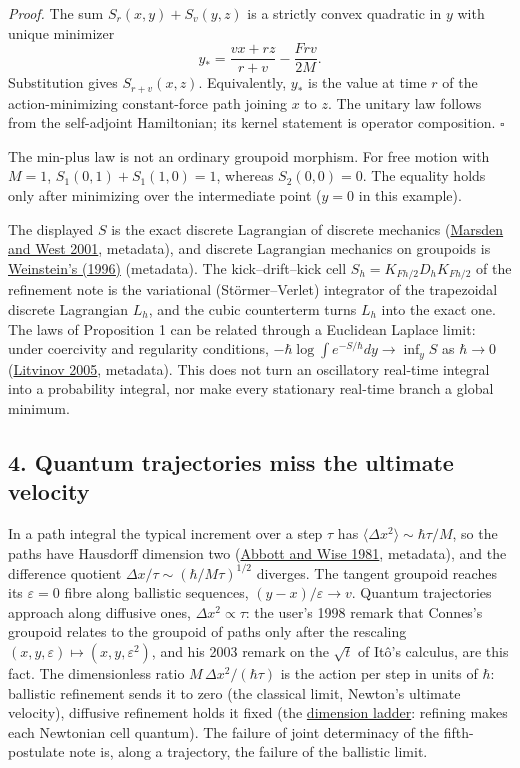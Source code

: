 \documentclass[11pt,a4paper]{article}
\begin{document}
\emph{Proof.} The sum \(S_r(x,y)+S_v(y,z)\) is a strictly convex
quadratic in \(y\) with unique minimizer
\[y_*=\frac{vx+rz}{r+v}-\frac{Frv}{2M}.\] Substitution gives
\(S_{r+v}(x,z)\). Equivalently, \(y_*\) is the value at time \(r\) of
the action-minimizing constant-force path joining \(x\) to \(z\). The
unitary law follows from the self-adjoint Hamiltonian; its kernel
statement is operator composition. \(\square\)

The min-plus law is not an ordinary groupoid morphism. For free motion
with \(M=1\), \(S_1(0,1)+S_1(1,0)=1\), whereas \(S_2(0,0)=0\). The
equality holds only after minimizing over the intermediate point
(\(y=0\) in this example).

The displayed \(S\) is the exact discrete Lagrangian of discrete
mechanics (\href{https://doi.org/10.1017/S096249290100006X}{Marsden and
West 2001}, metadata), and discrete Lagrangian mechanics on groupoids is
\href{https://doi.org/10.1090/fic/007/10}{Weinstein's (1996)}
(metadata). The kick--drift--kick cell \(S_h=K_{Fh/2}D_hK_{Fh/2}\) of
the refinement note is the variational (Störmer--Verlet) integrator of
the trapezoidal discrete Lagrangian \(L_h\), and the cubic counterterm
turns \(L_h\) into the exact one. The laws of Proposition 1 can be
related through a Euclidean Laplace limit: under coercivity and
regularity conditions, \(-\hbar\log\int e^{-S/\hbar}dy\to\inf_y S\) as
\(\hbar\to0\) (\href{https://doi.org/10.1090/conm/377/06982}{Litvinov
2005}, metadata). This does not turn an oscillatory real-time integral
into a probability integral, nor make every stationary real-time branch
a global minimum.

\hypertarget{quantum-trajectories-miss-the-ultimate-velocity}{%
\subsection{4. Quantum trajectories miss the ultimate
velocity}\label{quantum-trajectories-miss-the-ultimate-velocity}}

In a path integral the typical increment over a step \(\tau\) has
\(\langle\Delta x^2\rangle\sim\hbar\tau/M\), so the paths have Hausdorff
dimension two (\href{https://doi.org/10.1119/1.12657}{Abbott and Wise
1981}, metadata), and the difference quotient
\(\Delta x/\tau\sim(\hbar/M\tau)^{1/2}\) diverges. The tangent groupoid
reaches its \(\varepsilon=0\) fibre along ballistic sequences,
\((y-x)/\varepsilon\to v\). Quantum trajectories approach along
diffusive ones, \(\Delta x^2\propto\tau\): the user's 1998 remark that
Connes's groupoid relates to the groupoid of paths only after the
rescaling \((x,y,\varepsilon)\mapsto(x,y,\varepsilon^2)\), and his 2003
remark on the \(\sqrt t\) of Itô's calculus, are this fact. The
dimensionless ratio \(M\,\Delta x^2/(\hbar\tau)\) is the action per step
in units of \(\hbar\): ballistic refinement sends it to zero (the
classical limit, Newton's ultimate velocity), diffusive refinement holds
it fixed (the \href{dimension-ladder.md}{dimension ladder}: refining
makes each Newtonian cell quantum). The failure of joint determinacy of
the fifth-postulate note is, along a trajectory, the failure of the
ballistic limit.
\end{document}
